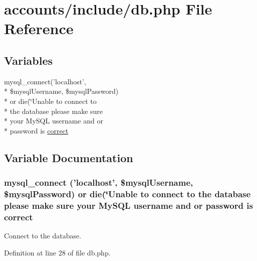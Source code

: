 \hypertarget{db_8php}{\section{accounts/include/db.php File Reference}
\label{db_8php}
}
\subsection*{Variables}
\begin{DoxyCompactItemize}
\item 
mysql\-\_\-connect('localhost', \\*
\$mysql\-Username, \$mysql\-Password) \\*
or die(\char`\"{}Unable to connect to \\*
the database please make sure \\*
your My\-S\-Q\-L username and or \\*
password is \hyperlink{db_8php_a3ad132d85e0af7f84f58fc6d8439ad1b}{correct}
\end{DoxyCompactItemize}


\subsection{Variable Documentation}
\hypertarget{db_8php_a3ad132d85e0af7f84f58fc6d8439ad1b}{
\subsubsection[{correct}]{\setlength{\rightskip}{0pt plus 5cm}mysql\-\_\-connect ('localhost', \$mysql\-Username, \$mysql\-Password) or die(\char`\"{}Unable to connect to the database please make sure your My\-S\-Q\-L username and or password is correct}}\label{db_8php_a3ad132d85e0af7f84f58fc6d8439ad1b}
Connect to the database. 

Definition at line 28 of file db.\-php.

